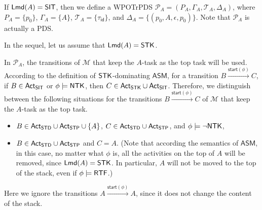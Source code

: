 \documentclass[preprint,12pt]{elsarticle}
\newcommand\Mm{{\mathcal{M} }}
\newcommand\Pp{{\mathcal{P} }}
\newcommand\act{{\sf Act}}
\newcommand\lmd{{\sf Lmd}}
\newcommand\standard{{\sf STD}}
\newcommand\singletop{{\sf STP}}
\newcommand\singletask{{\sf STK}}
\newcommand\singleinstance{{\sf SIT}}
\newcommand\ntkflag{{\sf NTK}}
\newcommand\rtfflag{{\sf RTF}}
\newcommand{\AMASS}{\textsf{ASM}}
\newcommand\startactivity{{\mathsf{start} }}
\newcommand{\STK}{\mathsf{STK}}
\newcommand{\SIT}{\mathsf{SIT}}
\newcommand{\id}{\mathsf{id}}
\newcommand\TranSet{{\mathscr{T} }}
\newcommand{\PDS}{\textsf{PDS}}
\newcommand{\WOTrPDS}{\textsf{WPOTrPDS}}
\begin{document}
If $\lmd(A) = \SIT$, then we define a {\WOTrPDS} $\Pp_A  = (P_A, \Gamma_A, \TranSet_A, \Delta_A)$, where $P_A = \{p_0\}$, $\Gamma_A = \{A\}$, $\TranSet_A = \{\tau_{\id}\}$, and $\Delta_A = \{(p_0, A, \epsilon, p_0)\}$. Note that $\Pp_A$ is actually a {\PDS}. 

In the sequel, let us assume that $\lmd(A) = \STK$. 

In $\Pp_A$, the transitions of $\Mm$ that keep the $A$-task as the top task will be used. According to the definition of $\singletask$-dominating $\AMASS$, for a transition $B \xrightarrow{\startactivity(\phi)} C$, if $B \in \act_\singleinstance$ or $\phi \models \ntkflag$, then $C \in \act_\singletask \cup \act_\singleinstance$. Therefore, we distinguish between the following situations for the transitions $B \xrightarrow{\startactivity(\phi)} C$ of $\Mm$ that keep the $A$-task as the top task. 
\begin{itemize}
\item $B \in \act_\standard \cup \act_\singletop \cup \{A\}$, $C \in \act_\standard \cup \act_\singletop$, and $\phi \models \neg \ntkflag$,
%
\item $B \in \act_\standard \cup \act_\singletop$ and $C = A$. (Note that according the semantics of $\AMASS$, in this case, no matter what $\phi$ is, all the activities on the top of $A$ will be removed, since $\lmd(A) = \singletask$. In particular, $A$ will not be moved to the top of the stack, even if $\phi \models \rtfflag$.)
\end{itemize}
Here we ignore the transitions $A \xrightarrow{\startactivity(\phi)} A$, since it does not change the content of the stack. 
\end{document}
